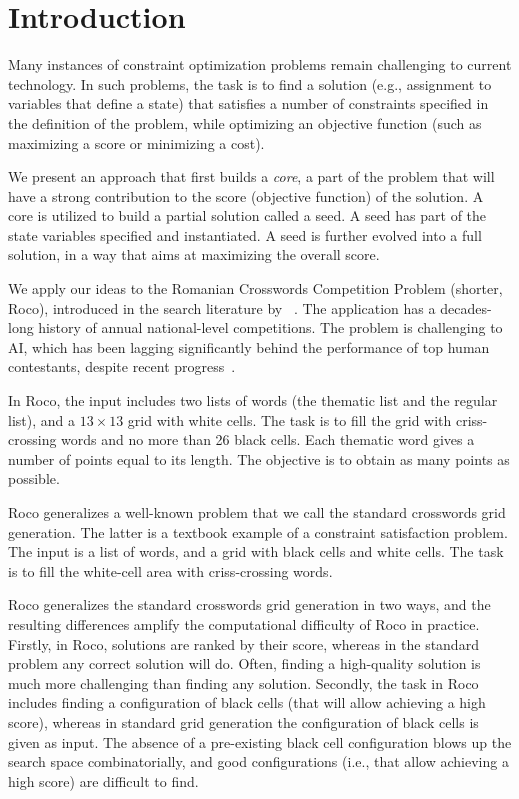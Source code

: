 \section{Introduction}
\label{sec::intro}

Many instances of constraint optimization problems
remain challenging to current technology.
In such problems, the task is to find a solution
(e.g., assignment to variables that define a state) 
that satisfies a number of constraints specified in the definition
of the problem, while optimizing an objective function
(such as maximizing a score or minimizing a cost).


We present an approach that first builds a \emph{core},
a part of the problem that will have a strong contribution
to the score (objective function) of the solution.
A core is utilized to build a partial solution called a seed.
A seed has part of the state variables specified and instantiated.
A seed is further evolved into a full solution, in a way that aims
at maximizing the overall score.

We apply our ideas to the Romanian Crosswords Competition Problem (shorter, {\sc Roco}),
introduced in the search literature by
\citeauthor{DBLP:conf/socs/BoteaB21}~.
The application has a decades-long history of annual national-level competitions.
The problem is challenging to AI, which has been lagging significantly
behind the performance of top human contestants,
despite recent progress~\cite{DBLP:conf/socs/BoteaB21,DBLP:conf/cig/BulitkoB21,Botea_Bulitko_2022}.

In {\sc Roco}, the input includes two lists of words (the thematic list and the regular list),
and a $13 \times 13$ grid with white cells.
The task is to fill the grid with criss-crossing words and no more than 26 black cells.
Each thematic word gives a number of points equal to its length. The objective
is to obtain as many points as possible.

{\sc Roco} generalizes a well-known problem that we
call the {standard crosswords grid generation}.
The latter is a textbook example of a constraint satisfaction problem.
The input is a list of words, and a grid with black cells and white cells.
The task is to fill the white-cell area with criss-crossing words.

{\sc Roco} generalizes the standard crosswords grid generation in two ways,
and the resulting differences amplify the computational difficulty of {\sc Roco} in practice.
Firstly, in {\sc Roco}, solutions are ranked by their score,
whereas in the standard problem any correct solution will do.
Often, finding a high-quality solution is much more challenging than finding any solution.
Secondly, the task in {\sc Roco} includes finding a configuration of black cells
(that will allow achieving a high score), whereas in standard grid
generation the configuration of black cells is given as input.
The absence of a pre-existing black cell configuration
blows up the search space combinatorially, and good configurations
(i.e., that allow achieving a high score) are difficult to find.

